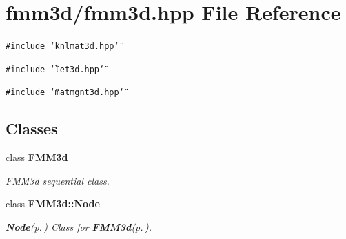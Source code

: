 \section{fmm3d/fmm3d.hpp File Reference}
\label{fmm3d_8hpp}


{\tt \#include \char`\"{}knlmat3d.hpp\char`\"{}}\par
{\tt \#include \char`\"{}let3d.hpp\char`\"{}}\par
{\tt \#include \char`\"{}matmgnt3d.hpp\char`\"{}}\par
\subsection*{Classes}
\begin{CompactItemize}
\item 
class {\bf FMM3d}
\begin{CompactList}\small\item\em FMM3d sequential class. \item\end{CompactList}\item 
class {\bf FMM3d::Node}
\begin{CompactList}\small\item\em {\bf Node}{\rm (p.\,\pageref{classFMM3d_1_1Node})} Class for {\bf FMM3d}{\rm (p.\,\pageref{classFMM3d})}. \item\end{CompactList}\end{CompactItemize}
